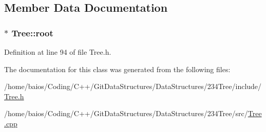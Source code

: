 \subsection{Member Data Documentation}
\hypertarget{class_tree_ad8e46ce0aead5778cbdd784d1e370d5f}{
\subsubsection[{root}]{$\ast$ Tree\-::root}}\label{class_tree_ad8e46ce0aead5778cbdd784d1e370d5f}


Definition at line 94 of file Tree.\-h.



The documentation for this class was generated from the following files\-:\begin{DoxyCompactItemize}
\item 
/home/baios/\-Coding/\-C++/\-Git\-Data\-Structures/\-Data\-Structures/234\-Tree/include/\hyperlink{_tree_8h}{Tree.\-h}\item 
/home/baios/\-Coding/\-C++/\-Git\-Data\-Structures/\-Data\-Structures/234\-Tree/src/\hyperlink{_tree_8cpp}{Tree.\-cpp}\end{DoxyCompactItemize}
